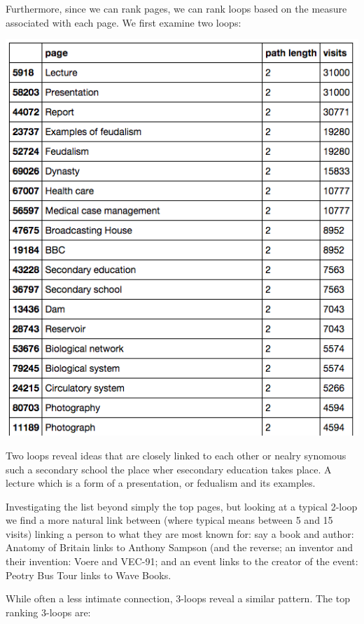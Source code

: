 \documentclass[twoside]{article}
\begin{document}
\begin{multicols}{2}
Furthermore, since we can rank pages, we can rank loops based on the measure associated with each page. We first examine two loops:

\includegraphics[scale=0.4]{graphics/top_2loops.png}

Two loops reveal ideas that are closely linked to each other or nealry synomous such a secondary school the place wher esecondary education takes place. A lecture which is a form of a presentation, or fedualism and its examples. 

Investigating the list beyond simply the top pages, but looking at a typical 2-loop we find a more natural link between (where typical means between 5 and 15 visits) linking a person to what they are most known for: say a book and author: Anatomy of Britain links to Anthony Sampson (and the reverse; an inventor and their invention: Voere and VEC-91; and an event links to the creator of the event: Peotry Bus Tour links to Wave Books.


While often a less intimate connection, 3-loops reveal a similar pattern. The top ranking 3-loops are:


\end{multicols}
\end{document}
